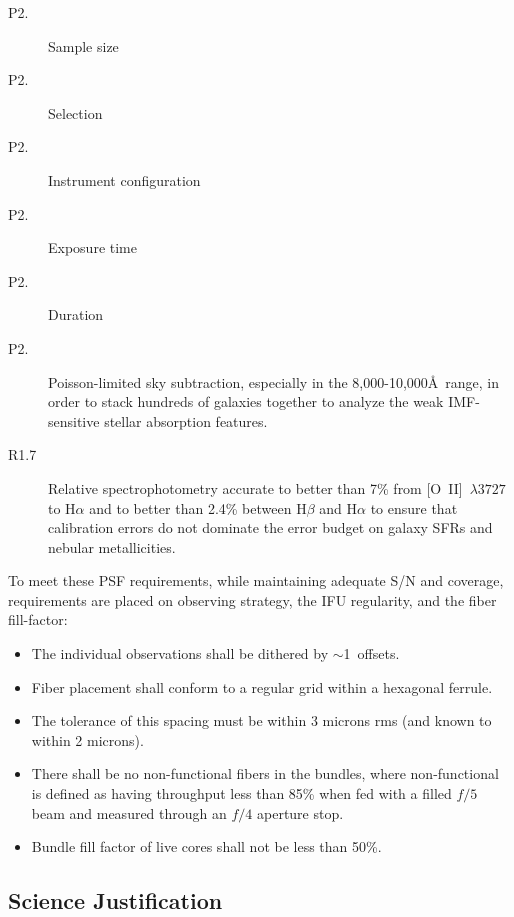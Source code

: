 \documentclass[preprint,11pt]{aastex}
\begin{document}
\begin{description}

\item[P2.] Sample size
\item[P2.] Selection 
\item[P2.] Instrument configuration 
\item[P2.] Exposure time
\item[P2.] Duration

\item[P2.] Poisson-limited sky subtraction, especially in the
  8,000-10,000\AA\ range, in order to stack hundreds of galaxies
  together to analyze the weak IMF-sensitive stellar absorption
  features.


\item[R1.7] Relative spectrophotometry accurate to better than 7\%
  from [O~II]~$\lambda3727$ to H$\alpha$ and to better than 2.4\%
  between H$\beta$ and H$\alpha$ to ensure that calibration errors do
  not dominate the error budget on galaxy SFRs and nebular
  metallicities.

  
\end{description}

\medskip
\noindent To meet these PSF requirements, while maintaining adequate
S/N and coverage, requirements are placed on observing
strategy, the IFU regularity, and the fiber fill-factor:

\begin{itemize}

\item The individual observations shall be dithered by $\sim$1\arcsec\
  offsets.

\item Fiber placement shall conform to a regular grid within a
  hexagonal ferrule.  

\item The tolerance of this spacing must be within 3 microns rms (and
  known to within 2 microns).

\item There shall be no non-functional fibers in the bundles, where
  non-functional is defined as having throughput less than 85\% when
  fed with a filled $f/5$ beam and measured through an $f/4$ aperture
  stop.

\item Bundle fill factor of live cores shall not be less than 50\%.

\end{itemize}


\subsection{Science Justification}
\end{document}

